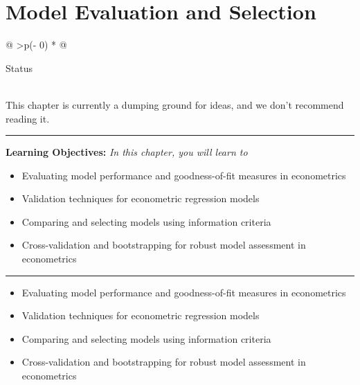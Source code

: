 \documentclass[
  letterpaper,
  paper =a4,
  twoside,
  openright,
  headsepline,
  footsepline,
  listof = totocnumbered,
  chapterprefix = true,
  firstiscover]{scrbook}
\providecommand{\abstractname}{Learning Objectives} %
\newenvironment{objectives}[1]{%
	\hrule
	\vspace{5pt}
	\small\textbf{\abstractname: } 
	\newline
	\vspace{0.1cm}
	\small\emph{#1} %
	\itshape %
}{%
	\vspace{5pt}
	\hrule
	\vspace{0.6cm}
}
\begin{document}
\hypertarget{model-evaluation-and-selection}{%
\chapter{Model Evaluation and
Selection}\label{model-evaluation-and-selection}}

\begin{longtable}[]{@{}
  >{\centering\arraybackslash}p{(\columnwidth - 0\tabcolsep) * }@{}}
\toprule\noalign{}
\begin{minipage}[b]{\linewidth}\centering
Status
\end{minipage} \\
\midrule\noalign{}
\endhead
\bottomrule\noalign{}
\endlastfoot
This chapter is currently a dumping ground for ideas, and we don't
recommend reading it. \\
\end{longtable}

\begin{objectives}{In this chapter, you will learn to}
\begin{itemize}

\item{Evaluating model performance and goodness-of-fit measures in econometrics}

\item{Validation techniques for econometric regression models}

\item{Comparing and selecting models using information criteria}

\item{Cross-validation and bootstrapping for robust model assessment in econometrics}

\end{itemize}

\end{objectives}

\begin{itemize}
\item
  Evaluating model performance and goodness-of-fit measures in
  econometrics
\item
  Validation techniques for econometric regression models
\item
  Comparing and selecting models using information criteria
\item
  Cross-validation and bootstrapping for robust model assessment in
  econometrics
\end{itemize}

\end{document}
